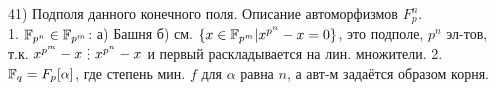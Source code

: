 41) Подполя данного конечного поля. Описание автоморфизмов $F_p^n$.\\
1. $\mathbb{F}_{p^n} \in \mathbb{F}_{p^m}$: а) Башня б) см. $\{x\in \mathbb{F}_{p^m} | x^{p^n}-x=0\}$, это подполе, $p^n$ эл-тов, т.к. $x^{p^m}-x \di x^{p^n}-x$ и первый раскладывается на лин. множители. 2. $\mathbb{F}_q=F_p[\alpha]$, где степень мин. $f$ для $\alpha$ равна $n$, а авт-м задаётся образом корня. \\
